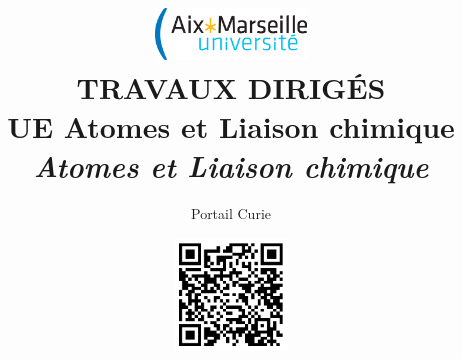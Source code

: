 \documentclass[12pt,a5paper,french,dvips,openright,twoside]{report}
\begin{document}
\title{{\includegraphics[width=4cm]{figure/logo-amu_cmjn.eps}      \\ [1cm]
\Huge \textbf{TRAVAUX DIRIG\'ES  \\[1.5cm] 
UE Atomes et Liaison chimique\\
\textsl{Atomes et Liaison chimique}}}}
\author{Portail Curie}
\date{\includegraphics[height=3cm]{figure/QRcode_fichier_TD.eps}}

\pagestyle{empty}
\maketitle

\tableofcontents

\pagestyle{plain}



%
%
%






\pagestyle{empty}



%
%
\end{document}
